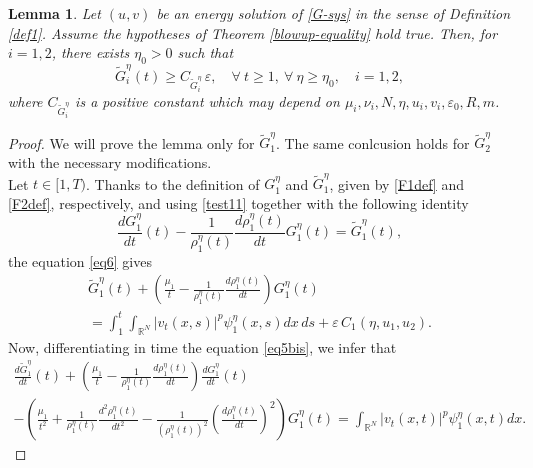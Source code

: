 \documentclass[12pt,leqno]{amsart}
\numberwithin{equation}{section}
\newtheorem{lem}{Lemma}[section]
\theoremstyle{remark}
\newcommand{\ep}{\varepsilon}
\def\R{{\mathbb{R}}}
\def\d{\displaystyle}
\def\e{{\varepsilon}}
\begin{document}
\begin{lem}\label{F11}
Let $(u,v)$ be an energy solution of  \eqref{G-sys} in the sense of Definition \ref{def1}. Assume the hypotheses of Theorem \ref{blowup-equality} hold true. Then,  for $i=1,2$, there exists $\eta_0>0$ such that
\begin{equation}
\label{F1postive}
\tilde{G}^{\eta}_i(t)\ge C_{\tilde{G}^{\eta}_i}\, \e, 
\quad \forall \ t \ge1, \ \forall \  \eta  \ge \eta_0, \quad i=1,2, 
\end{equation}
where $C_{\tilde{G}^{\eta}_i}$ is a positive constant which may depend on $\mu_i,\nu_i,N,\eta,u_i,v_i,\ep_0, R,m$.
\end{lem}
\begin{proof}
We will prove the lemma only for $\tilde{G}^{\eta}_1$. The same conlcusion holds for $\tilde{G}^{\eta}_2$ with the necessary modifications. \\
Let $t \in [1,T)$. Thanks to the definition of ${G}^{\eta}_1$ and  $\tilde{G}^{\eta}_1$, given  by \eqref{F1def} and  \eqref{F2def}, respectively, and using \eqref{test11} together with the following identity
 \begin{equation}\label{def23}\d \frac{d G^{\eta}_1}{dt}(t) -\frac{1}{\rho^{\eta}_1(t)}\frac{d\rho^{\eta}_1(t)}{dt}G^{\eta}_1(t)= \tilde{G}^{\eta}_1(t),\end{equation}
 the equation  \eqref{eq6} gives
\begin{equation}
\begin{array}{l}\label{eq5bis}
\d \tilde{G}^{\eta}_1(t)+\left(\frac{\mu_1}{t}-\frac{1}{\rho^{\eta}_1(t)}\frac{d\rho^{\eta}_1(t)}{dt}\right)G^{\eta}_1(t)\\
=\d \int_1^t\int_{\R^N}|v_t(x,s)|^p\psi^{\eta}_1(x,s)dx \, ds +\e \, C_1(\eta, u_1,u_2).
\end{array}
\end{equation}
Now, differentiating in time the  equation \eqref{eq5bis}, we infer that
\begin{equation}\label{F1+bis}
\begin{array}{l}
\d \frac{d \tilde{G}^{\eta}_1}{dt}(t)+\left(\frac{\mu_1}{t}-\frac{1}{\rho^{\eta}_1(t)}\frac{d\rho^{\eta}_1(t)}{dt}\right)\frac{d G^{\eta}_1}{dt}(t)\\
\d -\left(\frac{\mu_1}{t^2}+\frac{1}{\rho^{\eta}_1(t)}\frac{d^2\rho^{\eta}_1(t)}{dt^2}-\frac{1}{(\rho^{\eta}_1(t))^2}\left(\frac{d\rho^{\eta}_1(t)}{dt}\right)^2 \right)G^{\eta}_1(t) 
\d = \int_{\R^N}|v_t(x,t)|^p\psi^{\eta}_1(x,t)dx.
\end{array}
\end{equation}

\end{proof}
\end{document}
